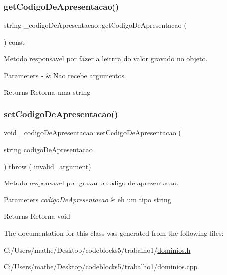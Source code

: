 \subsubsection{\texorpdfstring{getCodigoDeApresentacao()}{getCodigoDeApresentacao()}}
{\footnotesize\ttfamily string \+\_\+codigo\+De\+Apresentacao\+::get\+Codigo\+De\+Apresentacao (\begin{DoxyParamCaption}{ }\end{DoxyParamCaption}) const\hspace{0.3cm}{\ttfamily [inline]}}



Metodo responsavel por fazer a leitura do valor gravado no objeto. 


\begin{DoxyParams}{Parameters}
{\em -\/} & Nao recebe argumentos \\
\hline
\end{DoxyParams}
\begin{DoxyReturn}{Returns}
Retorna uma string 
\end{DoxyReturn}
\mbox{\label{class__codigo_de_apresentacao_a71d1caf08b03c8ab1247140b47cde6d3}} 
\subsubsection{\texorpdfstring{setCodigoDeApresentacao()}{setCodigoDeApresentacao()}}
{\footnotesize\ttfamily void \+\_\+codigo\+De\+Apresentacao\+::set\+Codigo\+De\+Apresentacao (\begin{DoxyParamCaption}\item[{string}]{codigo\+De\+Apresentacao }\end{DoxyParamCaption}) throw ( invalid\+\_\+argument) }



Metodo responsavel por gravar o codigo de apresentacao. 


\begin{DoxyParams}{Parameters}
{\em codigo\+De\+Apresentacao} & eh um tipo string \\
\hline
\end{DoxyParams}
\begin{DoxyReturn}{Returns}
Retorna void 
\end{DoxyReturn}


The documentation for this class was generated from the following files\+:\begin{DoxyCompactItemize}
\item 
C\+:/\+Users/mathe/\+Desktop/codeblocks5/trabalho1/\mbox{\hyperlink{dominios_8h}{dominios.\+h}}\item 
C\+:/\+Users/mathe/\+Desktop/codeblocks5/trabalho1/\mbox{\hyperlink{dominios_8cpp}{dominios.\+cpp}}\end{DoxyCompactItemize}
